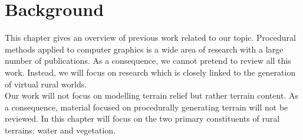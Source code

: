 
\chapter{Background} \label{chap:background}

This chapter gives an overview of previous work related to our topic. Procedural methods applied to computer graphics is a wide area of research with a large number of publications. As a consequence, we cannot pretend to review all this work. Instead, we will focus on research which is closely linked to the generation of virtual rural worlds. \\

Our work will not focus on modelling terrain relief but rather terrain content. As a consequence, material focused on procedurally generating terrain will not be reviewed. In this chapter will focus on the two primary constituents of rural terrains: water and vegetation.